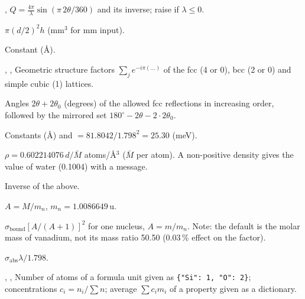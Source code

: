 \documentclass[11pt,a4paper]{article}
\begin{document}
, 
$Q = \frac{4\pi}{\lambda}\sin(\pi\,2\theta/360)$ and its inverse; raise if
$\lambda\le0$.

$\pi(d/2)^2h$ (mm$^3$ for mm input).


Constant  (\AA).

, , 
Geometric structure factors $\sum_j e^{-i\pi(\ldots)}$ of the fcc (4 or 0),
bcc (2 or 0) and simple cubic (1) lattices.

Angles $2\theta+2\theta_0$ (degrees) of the allowed fcc reflections in
increasing order, followed by the mirrored set $180^\circ-2\theta-2\cdot2\theta_0$.


Constants  (\AA) and
 $=81.8042/1.798^2 = 25.30$ (meV).

$\rho = 0.602214076\,d/\bar M$ atoms/\AA$^3$ ($\bar M$ per atom). A
non-positive density gives the value of water (0.1004) with a message.

Inverse of the above.

$A = M/m_n$, $m_n = 1.0086649$\,u.

$\sigma_\mathrm{bound}[A/(A+1)]^2$ for one nucleus, $A=m/m_n$. Note: the
default  is the molar mass of vanadium, not its mass ratio
50.50 (0.03\,\% effect on the factor).

 
$\sigma_\mathrm{abs}\lambda/1.798$.

, , 
Number of atoms of a formula unit given as \texttt{\{"Si": 1, "O": 2\}};
concentrations $c_i = n_i/\sum n$; average $\sum c_i m_i$ of a property
given as a dictionary.
\end{document}
